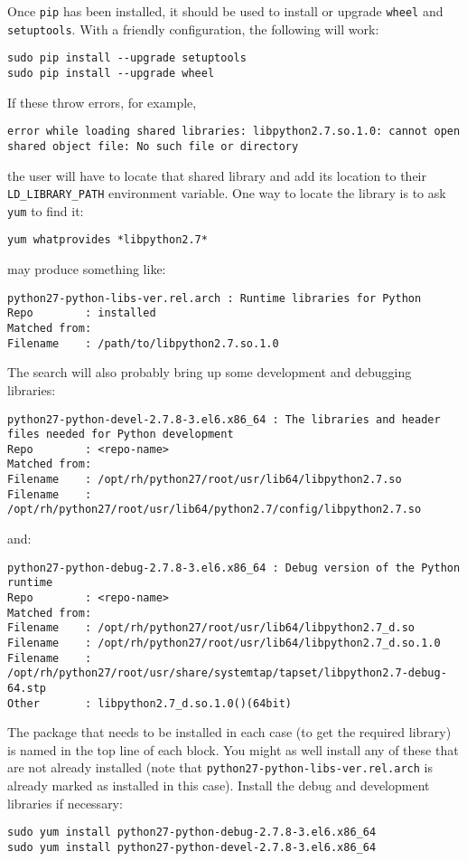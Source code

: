 Once \verb|pip| has been installed, it should be used 
to install or upgrade \verb|wheel| and \verb|setuptools|.
With a friendly configuration, the following will work:
\begin{lstlisting}
sudo pip install --upgrade setuptools 
sudo pip install --upgrade wheel 
\end{lstlisting}

If these throw errors, for example,
\begin{lstlisting}
error while loading shared libraries: libpython2.7.so.1.0: cannot open shared object file: No such file or directory
\end{lstlisting}
the user will have to locate that shared library 
and add its location to their \verb|LD_LIBRARY_PATH| environment variable.
One way to locate the library is to ask \verb|yum| to find it:
\begin{lstlisting}
yum whatprovides *libpython2.7*
\end{lstlisting}
may produce something like:
\begin{lstlisting}
python27-python-libs-ver.rel.arch : Runtime libraries for Python
Repo        : installed
Matched from:
Filename    : /path/to/libpython2.7.so.1.0
\end{lstlisting}
The search will also probably bring up some development and debugging libraries:
\begin{lstlisting}
python27-python-devel-2.7.8-3.el6.x86_64 : The libraries and header files needed for Python development
Repo        : <repo-name> 
Matched from:
Filename    : /opt/rh/python27/root/usr/lib64/libpython2.7.so
Filename    : /opt/rh/python27/root/usr/lib64/python2.7/config/libpython2.7.so
\end{lstlisting}
and:
\begin{lstlisting}
python27-python-debug-2.7.8-3.el6.x86_64 : Debug version of the Python runtime
Repo        : <repo-name> 
Matched from:
Filename    : /opt/rh/python27/root/usr/lib64/libpython2.7_d.so
Filename    : /opt/rh/python27/root/usr/lib64/libpython2.7_d.so.1.0
Filename    : /opt/rh/python27/root/usr/share/systemtap/tapset/libpython2.7-debug-64.stp
Other       : libpython2.7_d.so.1.0()(64bit)
\end{lstlisting}
The package that needs to be installed in each case 
(to get the required library)
is named in the top line of each block.
You might as well install any of these
that are not already installed
(note that \verb|python27-python-libs-ver.rel.arch|
is already marked as installed in this case).
Install the debug and development libraries if necessary:
\begin{lstlisting}
sudo yum install python27-python-debug-2.7.8-3.el6.x86_64
sudo yum install python27-python-devel-2.7.8-3.el6.x86_64
\end{lstlisting}

